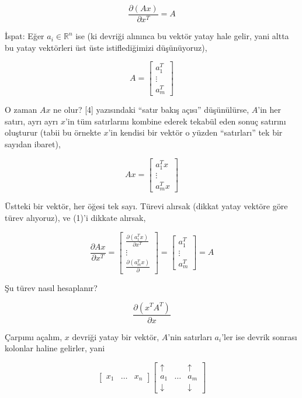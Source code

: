 \documentclass[12pt,fleqn]{article}\usepackage{../../common}
\begin{document}
$$ \frac{\partial(Ax)}{\partial x^T} = A
$$

İspat: Eğer $a_i \in \mathbb{R}^n$ ise (ki devriği alınınca bu vektör yatay hale
gelir, yani altta bu yatay vektörleri üst üste istiflediğimizi düşünüyoruz),

$$ A = \left[\begin{array}{c}
a_1^T \\ \vdots \\ a_m^T
\end{array}\right] $$

O zaman $Ax$ ne olur? [4] yazısındaki ``satır bakış açısı'' düşünülürse,
$A$'in her satırı, ayrı ayrı $x$'in tüm satırlarını kombine ederek tekabül
eden sonuç satırını oluşturur (tabii bu örnekte $x$'in kendisi bir vektör o
yüzden ``satırları'' tek bir sayıdan ibaret),

$$ Ax = \left[\begin{array}{c}
a_1^Tx \\ \vdots \\ a_m^Tx
\end{array}\right] 
$$

Üstteki bir vektör, her öğesi tek sayı. Türevi alırsak (dikkat yatay
vektöre göre türev alıyoruz), ve (1)'i dikkate alırsak, 

$$ 
\frac{\partial Ax}{\partial x^T}  =
\left[\begin{array}{c}
\frac{\partial(a_1^Tx) }{\partial x^T} 
\\ 
\vdots \\ 
\frac{\partial(a_m^Tx) }{\partial }
\end{array}\right] = \left[\begin{array}{c}
a_1^T \\ \vdots \\ a_m^T
\end{array}\right]  = A
 $$

Şu türev nasıl hesaplanır? 

$$ 
\frac{\partial (x^TA^T)}{\partial x}
$$

Çarpımı açalım, $x$ devriği yatay bir vektör, $A$'nin satırları $a_i$'ler
ise devrik sonrası kolonlar haline gelirler, yani

$$ 
\left[\begin{array}{ccc}
x_1 & \dots & x_n
\end{array}\right]
\left[\begin{array}{ccc}
\uparrow & & \uparrow \\
a_1 & \dots & a_m \\
\downarrow & & \downarrow 
\end{array}\right]
 $$
\end{document}
